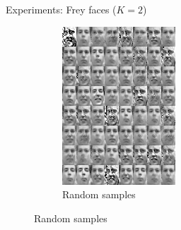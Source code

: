 \documentclass[unicode,11pt]{beamer}
\begin{document}
\begin{frame}[fragile]{Experiments: Frey faces ($K = 2$)}
\begin{figure}
\begin{subfigure}[b]{.4\linewidth}
      \includegraphics[width=.8\linewidth]{images/nf_frey_B400_E8000_N560_L2_H200_F2_C_sample_64}
      \caption{Random samples}
    \end{subfigure}
  \end{figure}
\end{frame}
\end{document}
